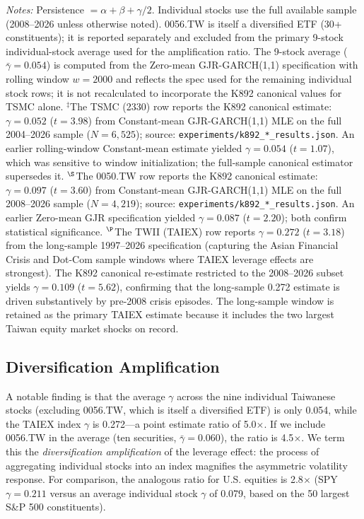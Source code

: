 \begin{table}[H]
\begin{flushleft}
\small \textit{Notes:} Persistence $= \alpha + \beta + \gamma/2$. Individual stocks use the full available sample (2008--2026 unless otherwise noted). 0056.TW is itself a diversified ETF (30+ constituents); it is reported separately and excluded from the primary 9-stock individual-stock average used for the amplification ratio. The 9-stock average ($\bar{\gamma} = 0.054$) is computed from the Zero-mean GJR-GARCH(1,1) specification with rolling window $w = 2000$ and reflects the spec used for the remaining individual stock rows; it is not recalculated to incorporate the K892 canonical values for TSMC alone. $^{\ddagger}$The TSMC (2330) row reports the K892 canonical estimate: $\gamma = 0.052$ ($t = 3.98$) from Constant-mean GJR-GARCH(1,1) MLE on the full 2004--2026 sample ($N = 6{,}525$); source: \texttt{experiments/k892\_*\_results.json}. An earlier rolling-window Constant-mean estimate yielded $\gamma = 0.054$ ($t = 1.07$), which was sensitive to window initialization; the full-sample canonical estimator supersedes it. $^{\S}$The 0050.TW row reports the K892 canonical estimate: $\gamma = 0.097$ ($t = 3.60$) from Constant-mean GJR-GARCH(1,1) MLE on the full 2008--2026 sample ($N = 4{,}219$); source: \texttt{experiments/k892\_*\_results.json}. An earlier Zero-mean GJR specification yielded $\gamma = 0.087$ ($t = 2.20$); both confirm statistical significance. $^{\P}$The TWII (TAIEX) row reports $\gamma = 0.272$ ($t = 3.18$) from the long-sample 1997--2026 specification (capturing the Asian Financial Crisis and Dot-Com sample windows where TAIEX leverage effects are strongest). The K892 canonical re-estimate restricted to the 2008--2026 subset yields $\gamma = 0.109$ ($t = 5.62$), confirming that the long-sample 0.272 estimate is driven substantively by pre-2008 crisis episodes. The long-sample window is retained as the primary TAIEX estimate because it includes the two largest Taiwan equity market shocks on record.
\end{flushleft}
\end{table}

\subsection{Diversification Amplification}

A notable finding is that the average $\gamma$ across the nine individual Taiwanese stocks (excluding 0056.TW, which is itself a diversified ETF) is only 0.054, while the TAIEX index $\gamma$ is 0.272---a point estimate ratio of 5.0$\times$. If we include 0056.TW in the average (ten securities, $\bar{\gamma} = 0.060$), the ratio is 4.5$\times$. We term this the \textit{diversification amplification} of the leverage effect: the process of aggregating individual stocks into an index magnifies the asymmetric volatility response. For comparison, the analogous ratio for U.S. equities is 2.8$\times$ (SPY $\gamma = 0.211$ versus an average individual stock $\gamma$ of 0.079, based on the 50 largest S\&P 500 constituents).

